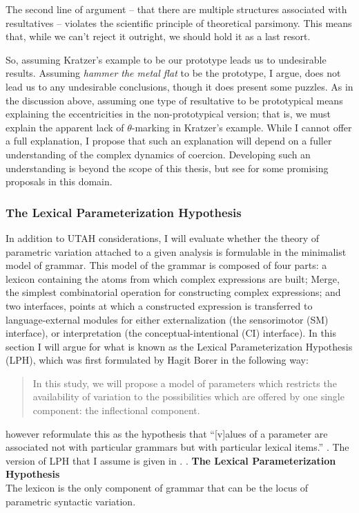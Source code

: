 The second line of argument -- that there are multiple structures associated with resultatives -- violates the scientific principle of theoretical parsimony.
This means that, while we can't reject it outright, we should hold it as a last resort.

So, assuming Kratzer's example to be our prototype leads us to undesirable results.
Assuming \textit{hammer the metal flat} to be the prototype, I argue, does not lead us to any undesirable conclusions, though it does present some puzzles.
As in the discussion above, assuming one type of resultative to be prototypical means explaining the eccentricities in the non-prototypical version;
that is, we must explain the apparent lack of $\theta$-marking in Kratzer's example.
While I cannot offer a full explanation, I propose that such an explanation will depend on a fuller understanding of the complex dynamics of coercion.
Developing such an understanding is beyond the scope of this thesis, but see \textcite{pustejovsky1998generative} for some promising proposals in this domain.

\subsubsection{The Lexical Parameterization Hypothesis}
In addition to UTAH considerations, I will evaluate whether the theory of parametric variation attached to a given analysis is formulable in the minimalist model of grammar.
This model of the grammar is composed of four parts:
	a lexicon containing the atoms from which complex expressions are built;
	Merge, the simplest combinatorial operation for constructing complex expressions; 
	and two interfaces, points at which a constructed expression is transferred to language-external modules for either externalization (the sensorimotor (SM) interface), or interpretation (the conceptual-intentional (CI) interface).
In this section I will argue for what is known as the Lexical Parameterization Hypothesis (LPH), which was first formulated by Hagit Borer in the following way:
\begin{quote}
	In this study, we will propose a model of parameters which restricts the availability of variation to the possibilities which are offered by one single component: the inflectional component. \parencite[3]{borer1984parametric}
\end{quote}
\textcite{manzini1987parameters} however reformulate this as the hypothesis that ``[v]alues of a parameter are associated not with particular grammars but with particular lexical items.'' \parencite[424]{manzini1987parameters}.
The version of LPH that I assume is given in \Next.
\ex. \textbf{The Lexical Parameterization Hypothesis}\\
The lexicon is the only component of grammar that can be the locus of parametric syntactic variation.

